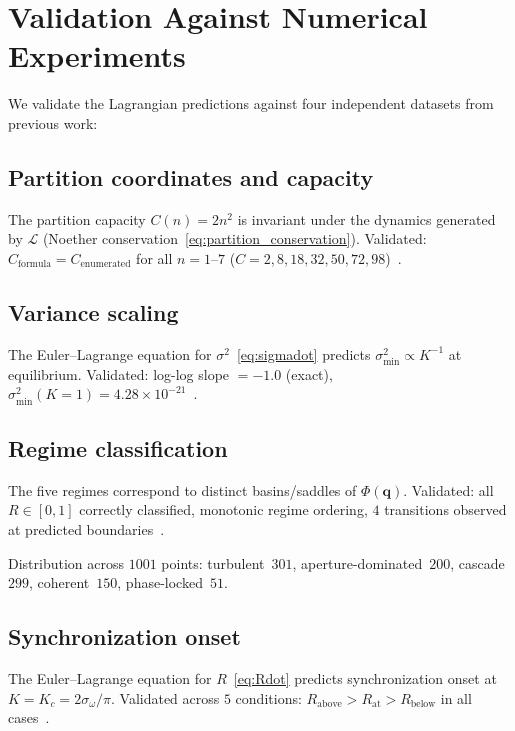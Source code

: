 \documentclass[twocolumn,aps,prl,superscriptaddress,floatfix]{revtex4-2}
\newcommand{\Lag}{\mathcal{L}}
\newcommand{\Pot}{\Phi}
\newcommand{\qvec}{\mathbf{q}}
\newcommand{\Kc}{K_c}
\begin{document}
\section{Validation Against Numerical Experiments}
\label{sec:validation}

We validate the Lagrangian predictions against four independent datasets from previous work:

\subsection{Partition coordinates and capacity}

The partition capacity $C(n) = 2n^2$ is invariant under the dynamics generated by $\Lag$ (Noether conservation~\eqref{eq:partition_conservation}).
Validated: $C_{\mathrm{formula}} = C_{\mathrm{enumerated}}$ for all $n = 1$--$7$ ($C = 2, 8, 18, 32, 50, 72, 98$)~\cite{sachikonye2026operator}.

\subsection{Variance scaling}

The Euler--Lagrange equation for $\sigma^2$~\eqref{eq:sigmadot} predicts $\sigma^2_{\mathrm{min}} \propto K^{-1}$ at equilibrium.
Validated: log-log slope $= -1.0$ (exact), $\sigma^2_{\mathrm{min}}(K=1) = 4.28 \times 10^{-21}$~\cite{sachikonye2026operator}.

\subsection{Regime classification}

The five regimes correspond to distinct basins/saddles of $\Pot(\qvec)$.
Validated: all $R \in [0,1]$ correctly classified, monotonic regime ordering, $4$ transitions observed at predicted boundaries~\cite{sachikonye2026operator}.

Distribution across $1001$ points: turbulent~$301$, aperture-dominated~$200$, cascade~$299$, coherent~$150$, phase-locked~$51$.

\subsection{Synchronization onset}

The Euler--Lagrange equation for $R$~\eqref{eq:Rdot} predicts synchronization onset at $K = \Kc = 2\sigma_\omega/\pi$.
Validated across $5$ conditions: $R_{\mathrm{above}} > R_{\mathrm{at}} > R_{\mathrm{below}}$ in all cases~\cite{sachikonye2026operator}.
\end{document}
